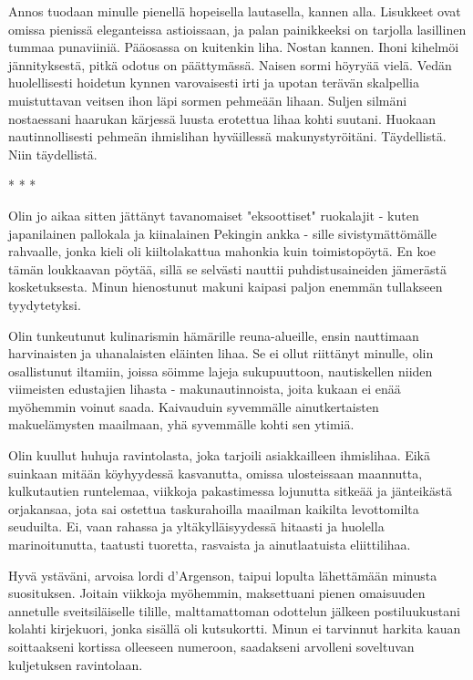 Annos tuodaan minulle pienellä hopeisella lautasella, kannen alla. Lisukkeet ovat omissa pienissä eleganteissa astioissaan, ja palan painikkeeksi on tarjolla lasillinen tummaa punaviiniä. Pääosassa on kuitenkin liha. Nostan kannen. Ihoni kihelmöi jännityksestä, pitkä odotus on päättymässä. Naisen sormi höyryää vielä. Vedän huolellisesti hoidetun kynnen varovaisesti irti ja upotan terävän skalpellia muistuttavan veitsen ihon läpi sormen pehmeään lihaan. Suljen silmäni nostaessani haarukan kärjessä luusta erotettua lihaa kohti suutani. Huokaan nautinnollisesti pehmeän ihmislihan hyväillessä makunystyröitäni. Täydellistä. Niin täydellistä.






* * *

Olin jo aikaa sitten jättänyt tavanomaiset "eksoottiset" ruokalajit - kuten japanilainen pallokala ja kiinalainen Pekingin ankka - sille sivistymättömälle rahvaalle, jonka kieli oli kiiltolakattua mahonkia kuin toimistopöytä. En koe tämän loukkaavan pöytää, sillä se selvästi nauttii puhdistusaineiden jämerästä kosketuksesta. Minun hienostunut makuni kaipasi paljon enemmän tullakseen tyydytetyksi.


Olin tunkeutunut kulinarismin hämärille reuna-alueille, ensin nauttimaan harvinaisten ja uhanalaisten eläinten lihaa. Se ei ollut riittänyt minulle, olin osallistunut iltamiin, joissa söimme lajeja sukupuuttoon, nautiskellen niiden viimeisten edustajien lihasta - makunautinnoista, joita kukaan ei enää myöhemmin voinut saada. Kaivauduin syvemmälle ainutkertaisten makuelämysten maailmaan, yhä syvemmälle kohti sen ytimiä.


Olin kuullut huhuja ravintolasta, joka tarjoili asiakkailleen ihmislihaa. Eikä suinkaan mitään köyhyydessä kasvanutta, omissa ulosteissaan maannutta, kulkutautien runtelemaa, viikkoja pakastimessa lojunutta sitkeää ja jänteikästä orjakansaa, jota sai ostettua taskurahoilla maailman kaikilta levottomilta seuduilta. Ei, vaan rahassa ja yltäkylläisyydessä hitaasti ja huolella marinoitunutta, taatusti tuoretta, rasvaista ja ainutlaatuista eliittilihaa.


Hyvä ystäväni, arvoisa lordi d'Argenson, taipui lopulta lähettämään minusta suosituksen. Joitain viikkoja myöhemmin, maksettuani pienen omaisuuden annetulle sveitsiläiselle tilille, malttamattoman odottelun jälkeen postiluukustani kolahti kirjekuori, jonka sisällä oli kutsukortti. Minun ei tarvinnut harkita kauan soittaakseni kortissa olleeseen numeroon, saadakseni arvolleni soveltuvan kuljetuksen ravintolaan.






